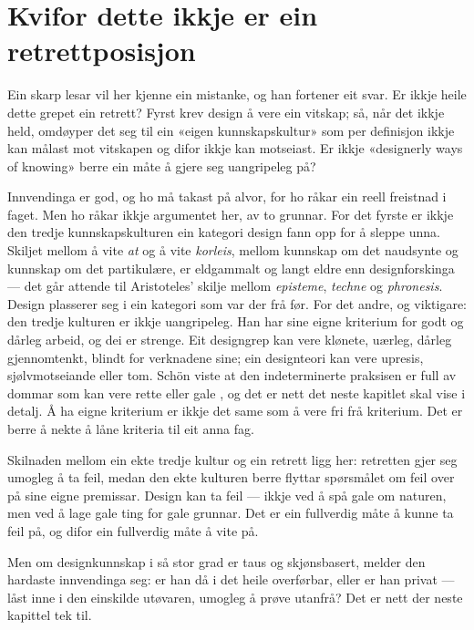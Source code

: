 \section{Kvifor dette ikkje er ein retrettposisjon}

Ein skarp lesar vil her kjenne ein mistanke, og han fortener eit svar. Er ikkje heile dette grepet ein retrett? Fyrst krev design å vere ein vitskap; så, når det ikkje held, omdøyper det seg til ein «eigen kunnskapskultur» som per definisjon ikkje kan målast mot vitskapen og difor ikkje kan motseiast. Er ikkje «designerly ways of knowing» berre ein måte å gjere seg uangripeleg på?

Innvendinga er god, og ho må takast på alvor, for ho råkar ein reell freistnad i faget. Men ho råkar ikkje argumentet her, av to grunnar. For det fyrste er ikkje den tredje kunnskapskulturen ein kategori design fann opp for å sleppe unna. Skiljet mellom å vite \emph{at} og å vite \emph{korleis}, mellom kunnskap om det naudsynte og kunnskap om det partikulære, er eldgammalt og langt eldre enn designforskinga — det går attende til Aristoteles' skilje mellom \emph{episteme}, \emph{techne} og \emph{phronesis}. Design plasserer seg i ein kategori som var der frå før. For det andre, og viktigare: den tredje kulturen er ikkje uangripeleg. Han har sine eigne kriterium for godt og dårleg arbeid, og dei er strenge. Eit designgrep kan vere klønete, uærleg, dårleg gjennomtenkt, blindt for verknadene sine; ein designteori kan vere upresis, sjølvmotseiande eller tom. Schön viste at den indeterminerte praksisen er full av dommar som kan vere rette eller gale \autocite{schon1983}, og det er nett det neste kapitlet skal vise i detalj. Å ha eigne kriterium er ikkje det same som å vere fri frå kriterium. Det er berre å nekte å låne kriteria til eit anna fag.

Skilnaden mellom ein ekte tredje kultur og ein retrett ligg her: retretten gjer seg umogleg å ta feil, medan den ekte kulturen berre flyttar spørsmålet om feil over på sine eigne premissar. Design kan ta feil — ikkje ved å spå gale om naturen, men ved å lage gale ting for gale grunnar. Det er ein fullverdig måte å kunne ta feil på, og difor ein fullverdig måte å vite på.

\vignett

Men om designkunnskap i så stor grad er taus og skjønsbasert, melder den hardaste innvendinga seg: er han då i det heile overførbar, eller er han privat — låst inne i den einskilde utøvaren, umogleg å prøve utanfrå? Det er nett der neste kapittel tek til.


